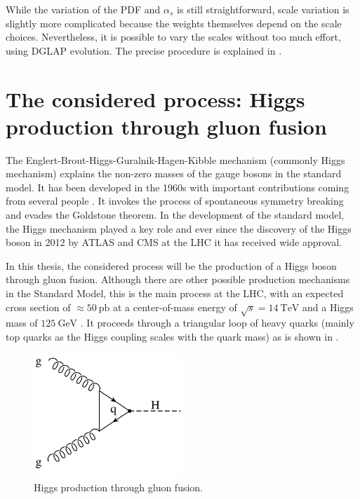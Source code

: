 While the variation of the PDF and $\alpha_s$ is still straightforward, scale variation is slightly more complicated because the weights themselves depend on the scale choices.
Nevertheless, it is possible to vary the scales without too much effort, using DGLAP evolution.
The precise procedure is explained in \cite{applgrid2010}.
%
\section{The considered process: Higgs production through gluon fusion}
The Englert-Brout-Higgs-Guralnik-Hagen-Kibble mechanism (commonly Higgs mechanism) explains the non-zero masses of the gauge bosons in the standard model.
It has been developed in the 1960s with important contributions coming from several people \cite{higgs1964a,higgs1964b,englert1964,guralnik1964,nambu1960,anderson1963}.
It invokes the process of spontaneous symmetry breaking and evades the Goldstone theorem.
In the development of the standard model, the Higgs mechanism played a key role and ever since the discovery of the Higgs boson in 2012 by ATLAS \cite{higgsdiscovery_atlas2012} and CMS \cite{higgsdiscovery_cms2012} at the LHC it has received wide approval.

In this thesis, the considered process will be the production of a Higgs boson through gluon fusion.
Although there are other possible production mechanisms in the Standard Model, this is the main process at the LHC, with an expected cross section of $\approx \SI{50}{\pico\barn}$ at a center-of-mass energy of $\sqrt{s} = \SI{14}{\tera\electronvolt}$ and a Higgs mass of $\SI{125}{\giga\electronvolt}$ \cite{higgshandbook1}.
It proceeds through a triangular loop of heavy quarks (mainly top quarks as the Higgs coupling scales with the quark mass) as is shown in .
%
\begin{figure}[]
	\includegraphics[width=0.5\textwidth]{images/gluonfusion.pdf}
	\caption{Higgs production through gluon fusion.}
	\label{fig:gluonfusion}
\end{figure}
%

